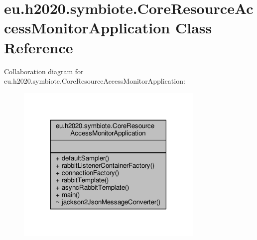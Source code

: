 \hypertarget{classeu_1_1h2020_1_1symbiote_1_1CoreResourceAccessMonitorApplication}{}\section{eu.\+h2020.\+symbiote.\+Core\+Resource\+Access\+Monitor\+Application Class Reference}
\label{classeu_1_1h2020_1_1symbiote_1_1CoreResourceAccessMonitorApplication}


Collaboration diagram for eu.\+h2020.\+symbiote.\+Core\+Resource\+Access\+Monitor\+Application\+:
\nopagebreak
\begin{figure}[H]
\begin{center}
\leavevmode
\includegraphics[width=254pt]{classeu_1_1h2020_1_1symbiote_1_1CoreResourceAccessMonitorApplication__coll__graph}
\end{center}
\end{figure}
